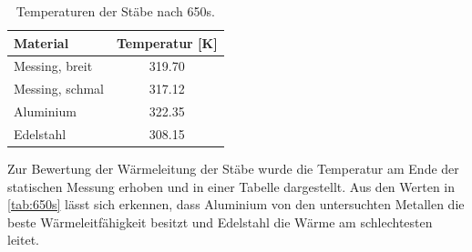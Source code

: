 \begin{table}[H]
  \centering
  \caption{Temperaturen der Stäbe nach 650s.}
  \label{tab:650s}
  \begin{tabular}{l S[table-format=3.2]}
    \toprule
    {Material} & {Temperatur [K]}\\
    \midrule
    {Messing, breit} & 319.70\\
    {Messing, schmal} & 317.12\\
    {Aluminium} & 322.35\\
    {Edelstahl} & 308.15\\
    \bottomrule
  \end{tabular}
\end{table}
\noindent Zur Bewertung der Wärmeleitung der Stäbe wurde die Temperatur am Ende der statischen Messung erhoben und in einer Tabelle dargestellt.
Aus den Werten in \autoref{tab:650s} lässt sich erkennen, dass Aluminium von den untersuchten Metallen die beste Wärmeleitfähigkeit besitzt
und Edelstahl die Wärme am schlechtesten leitet.

